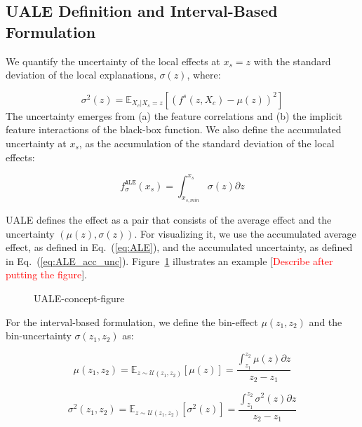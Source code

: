 \documentclass[twoside]{article}
\newcommand{\dfdx}{f^s}
\newcommand{\todo}[1]{[\textcolor{red}{#1}]}
\begin{document}
\subsection{UALE Definition and Interval-Based Formulation}
\label{sec:UALE-definition-1}

We quantify the uncertainty of the local effects at \(x_s=z\) with the
standard deviation of the local explanations, \(\sigma(z)\), where:

\begin{equation}
  \label{eq:ALE_var}
  \sigma^2(z) = \mathbb{E}_{X_c|X_s=z}\left [ \left (\dfdx (z, X_c) - \mu(z) \right )^2 \right ] 
\end{equation}
\noindent
The uncertainty emerges from (a) the feature correlations and (b) the
implicit feature interactions of the black-box function. We also
define the accumulated uncertainty at \(x_s\), as the accumulation of
the standard deviation of the local effects:

\begin{equation}
  \label{eq:ALE_acc_unc}
  f^{\mathtt{ALE}}_{\sigma}(x_s) = \int_{x_{s, min}}^{x_s} \sigma(z) \partial z
\end{equation}
\noindent

UALE defines the effect as a pair that consists of the average effect
and the uncertainty \((\mu(z), \sigma(z))\). For visualizing it, we
use the accumulated average effect, as defined in Eq.~(\ref{eq:ALE}),
and the accumulated uncertainty, as defined in
Eq.~(\ref{eq:ALE_acc_unc}). Figure~\ref{fig:UALE-figure} illustrates
an example \todo{Describe after putting the figure}.

\begin{figure}
  \centering
  \caption{UALE-concept-figure}
  \label{fig:UALE-figure}
\end{figure}

For the interval-based formulation, we define the bin-effect
\(\mu(z_1, z_2)\) and the bin-uncertainty \(\sigma(z_1, z_2)\) as:

\begin{equation}
  \label{eq:mu_bin}
    \mu(z_1, z_2) = \mathbb{E}_{z \sim \mathcal{U}(z_1,z_2)} [\mu(z)]
    = \frac{\int_{z_1}^{z_2} \mu(z) \partial z}{z_2 - z_1}
\end{equation}

\begin{equation}
  \label{eq:var_bin}
  \sigma^2(z_1, z_2) = \mathbb{E}_{z \sim \mathcal{U}(z_1,z_2)} [\sigma^2(z)] =  \frac{\int_{z_1}^{z_2} \sigma^2(z)  \partial z}{z_2 - z_1}
\end{equation}
\end{document}
